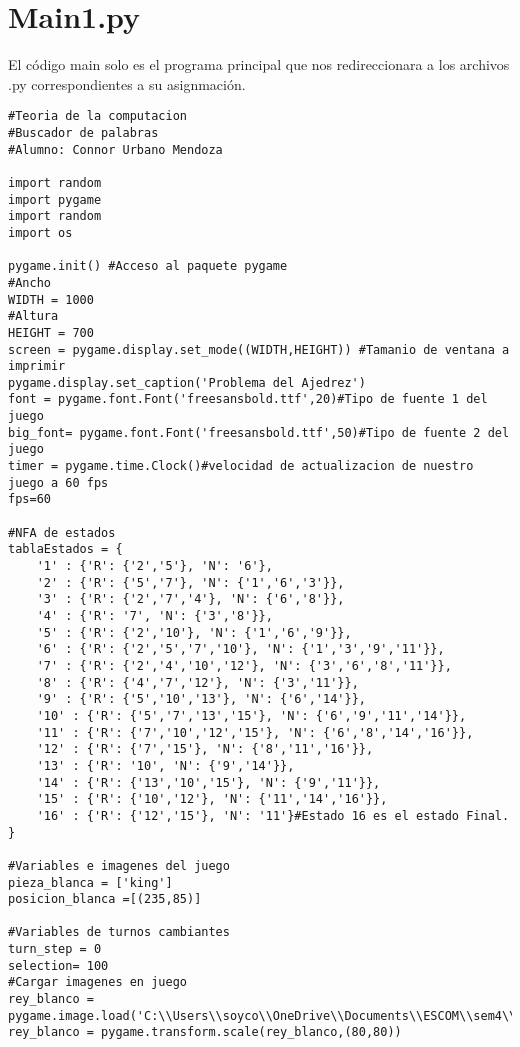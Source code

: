 \section{Main1.py}
El código main solo es el programa principal que nos redireccionara a los archivos .py correspondientes a su asignmación. \newline
\\
\begin{lstlisting}
#Teoria de la computacion
#Buscador de palabras
#Alumno: Connor Urbano Mendoza

import random
import pygame
import random
import os

pygame.init() #Acceso al paquete pygame
#Ancho
WIDTH = 1000
#Altura
HEIGHT = 700
screen = pygame.display.set_mode((WIDTH,HEIGHT)) #Tamanio de ventana a imprimir
pygame.display.set_caption('Problema del Ajedrez')
font = pygame.font.Font('freesansbold.ttf',20)#Tipo de fuente 1 del juego
big_font= pygame.font.Font('freesansbold.ttf',50)#Tipo de fuente 2 del juego
timer = pygame.time.Clock()#velocidad de actualizacion de nuestro juego a 60 fps
fps=60

#NFA de estados
tablaEstados = {
    '1' : {'R': {'2','5'}, 'N': '6'},
    '2' : {'R': {'5','7'}, 'N': {'1','6','3'}},
    '3' : {'R': {'2','7','4'}, 'N': {'6','8'}},
    '4' : {'R': '7', 'N': {'3','8'}},
    '5' : {'R': {'2','10'}, 'N': {'1','6','9'}},
    '6' : {'R': {'2','5','7','10'}, 'N': {'1','3','9','11'}},
    '7' : {'R': {'2','4','10','12'}, 'N': {'3','6','8','11'}},
    '8' : {'R': {'4','7','12'}, 'N': {'3','11'}},
    '9' : {'R': {'5','10','13'}, 'N': {'6','14'}},
    '10' : {'R': {'5','7','13','15'}, 'N': {'6','9','11','14'}},
    '11' : {'R': {'7','10','12','15'}, 'N': {'6','8','14','16'}},
    '12' : {'R': {'7','15'}, 'N': {'8','11','16'}},
    '13' : {'R': '10', 'N': {'9','14'}},
    '14' : {'R': {'13','10','15'}, 'N': {'9','11'}},
    '15' : {'R': {'10','12'}, 'N': {'11','14','16'}},
    '16' : {'R': {'12','15'}, 'N': '11'}#Estado 16 es el estado Final.
}

#Variables e imagenes del juego
pieza_blanca = ['king']
posicion_blanca =[(235,85)]

#Variables de turnos cambiantes
turn_step = 0
selection= 100
#Cargar imagenes en juego
rey_blanco = pygame.image.load('C:\\Users\\soyco\\OneDrive\\Documents\\ESCOM\\sem4\\Teoria\\P2\\Chess\\img\\white_king.png')
rey_blanco = pygame.transform.scale(rey_blanco,(80,80))


\end{lstlisting}
